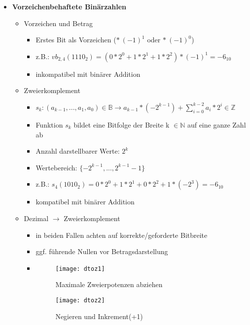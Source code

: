 \begin{itemize}
\begin{itemize}
	\end{itemize}

\item \textbf{Vorzeichenbehaftete Binärzahlen}
	\begin{itemize}
	\item Vorzeichen und Betrag
		\begin{itemize}
		\item Erstes Bit als Vorzeichen ($*~(-1)^1$ oder $*~(-1)^0$)
		\item z.B.: $vb_{2,4}(1110_2)=(0*2^0+1*2^1+1*2^2)*(-1)^1=-6_{10}$
		\item inkompatibel mit binärer Addition 
		\end{itemize}
		
	\item Zweierkomplement
		\begin{itemize}
		\item $s_k:(a_{k-1},...,a_1,a_0) \in \mathbb{B} \rightarrow a_{k-1} * (-2^{k-1}) + \sum^{k-2}_{i=0} a_i * 2^i \in \mathbb{Z}$
		\item Funktion $s_k$ bildet eine Bitfolge der Breite k $\in \mathbb{N}$ auf eine ganze Zahl ab
		\item Anzahl darstellbarer Werte: $2^k$
		\item Wertebereich: $\{-2^{k-1},...,2^{k-1}-1\}$
		\item z.B.: $s_4(1010_2) = 0*2^0+1*2^1+0*2^2+1*(-2^3)=-6_{10}$
		\item kompatibel mit binärer Addition
		\end{itemize}			
	
	\item Dezimal $\rightarrow$ Zweierkomplement
		\begin{itemize}
		\item in beiden Fallen achten auf korrekte/geforderte Bitbreite 
		\item ggf. führende Nullen vor Betragsdarstellung
		\item[]
			\begin{minipage}{0.4\textwidth}
				\begin{figure}[H]
				\texttt{[image: dtoz1]}
				\caption{Maximale Zweierpotenzen abziehen}
				\end{figure}
			\end{minipage}
			\begin{minipage}[t]{0.45\textwidth}
				\begin{figure}[H]
				\vspace{-3cm}
				\texttt{[image: dtoz2]}
				\caption{Negieren und Inkrement(+1)}
				\end{figure}
			\end{minipage}
		

\end{itemize}
\end{itemize}
\end{itemize}
